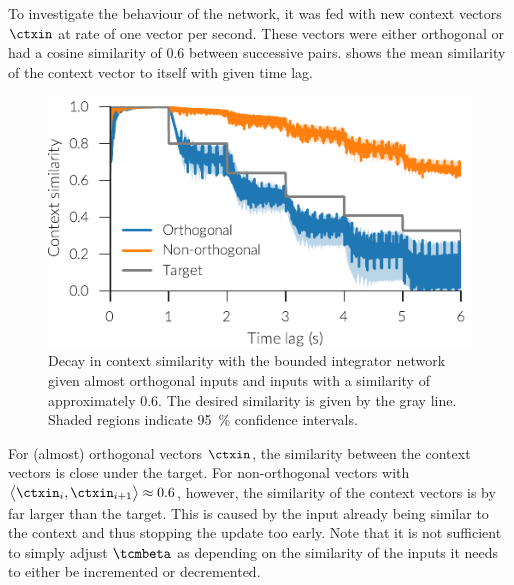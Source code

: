 To investigate the behaviour of the network, it was fed with new context vectors $\ctxin$ at rate of one vector per second.
These vectors were either orthogonal or had a cosine similarity of \num{0.6} between successive pairs.
 shows the mean similarity of the context vector to itself with given time lag.
\begin{figure}
    \centering
    \includegraphics{figures/context-analysis/bounded-integrator}
    \caption[Decay in context similarity with the bounded integrator network.]{
        Decay in context similarity with the bounded integrator network given almost orthogonal inputs and inputs with a similarity of approximately \num{0.6}.
        The desired similarity is given by the gray line. Shaded regions indicate \SI{95}{\percent} confidence intervals.}\label{fig:bounded-integrator}
\end{figure}
For (almost) orthogonal vectors $\ctxin$, the similarity between the context vectors is close under the target.
For non-orthogonal vectors with $\big\langle\ctxin_i, \ctxin_{i+1}\big\rangle \approx 0.6$, however, the similarity of the context vectors is by far larger than the target.
This is caused by the input already being similar to the context and thus stopping the update too early.
Note that it is not sufficient to simply adjust $\tcmbeta$ as depending on the similarity of the inputs it needs to either be incremented or decremented.

